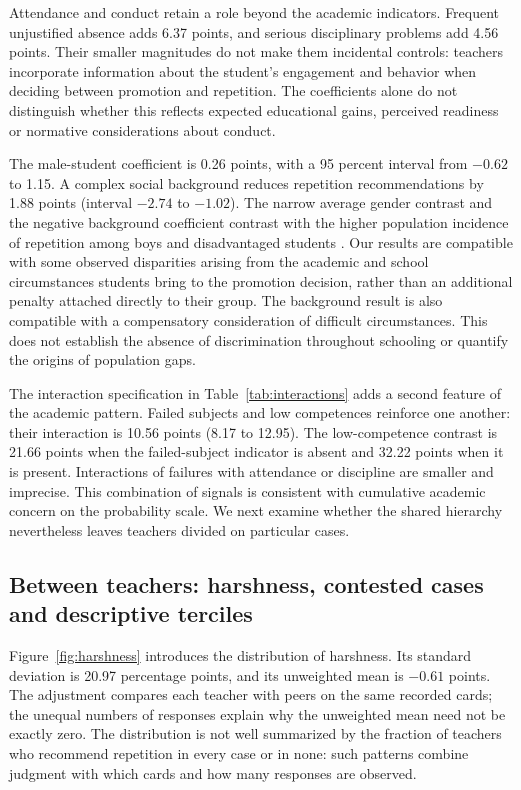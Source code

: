 Attendance and conduct retain a role beyond the academic indicators. Frequent unjustified absence adds 6.37 points, and serious disciplinary problems add 4.56 points. Their smaller magnitudes do not make them incidental controls: teachers incorporate information about the student's engagement and behavior when deciding between promotion and repetition. The coefficients alone do not distinguish whether this reflects expected educational gains, perceived readiness or normative considerations about conduct.

The male-student coefficient is 0.26 points, with a 95 percent interval from $-0.62$ to 1.15. A complex social background reduces repetition recommendations by 1.88 points (interval $-2.74$ to $-1.02$). The narrow average gender contrast and the negative background coefficient contrast with the higher population incidence of repetition among boys and disadvantaged students \cite{oecd}. Our results are compatible with some observed disparities arising from the academic and school circumstances students bring to the promotion decision, rather than an additional penalty attached directly to their group. The background result is also compatible with a compensatory consideration of difficult circumstances. This does not establish the absence of discrimination throughout schooling or quantify the origins of population gaps.

The interaction specification in Table~\ref{tab:interactions} adds a second feature of the academic pattern. Failed subjects and low competences reinforce one another: their interaction is 10.56 points (8.17 to 12.95). The low-competence contrast is 21.66 points when the failed-subject indicator is absent and 32.22 points when it is present. Interactions of failures with attendance or discipline are smaller and imprecise. This combination of signals is consistent with cumulative academic concern on the probability scale. We next examine whether the shared hierarchy nevertheless leaves teachers divided on particular cases.

\subsection{Between teachers: harshness, contested cases and descriptive terciles}
Figure~\ref{fig:harshness} introduces the distribution of harshness. Its standard deviation is 20.97 percentage points, and its unweighted mean is $-0.61$ points. The adjustment compares each teacher with peers on the same recorded cards; the unequal numbers of responses explain why the unweighted mean need not be exactly zero. The distribution is not well summarized by the fraction of teachers who recommend repetition in every case or in none: such patterns combine judgment with which cards and how many responses are observed.

